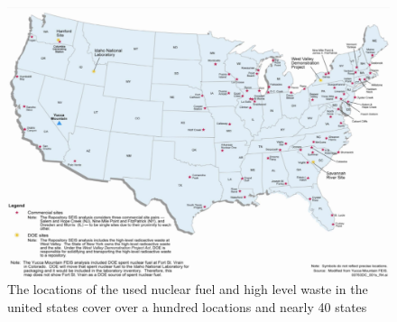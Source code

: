 
\begin{figure}[htb!]
  \begin{center}
    \includegraphics{locations.eps}
  \end{center}
  \caption{The locations of the used nuclear fuel and high level waste in the 
  united states cover over a hundred locations and nearly 40 states 
  \cite{doe_supplemental_2008}}
  \label{fig:locations}
\end{figure}

